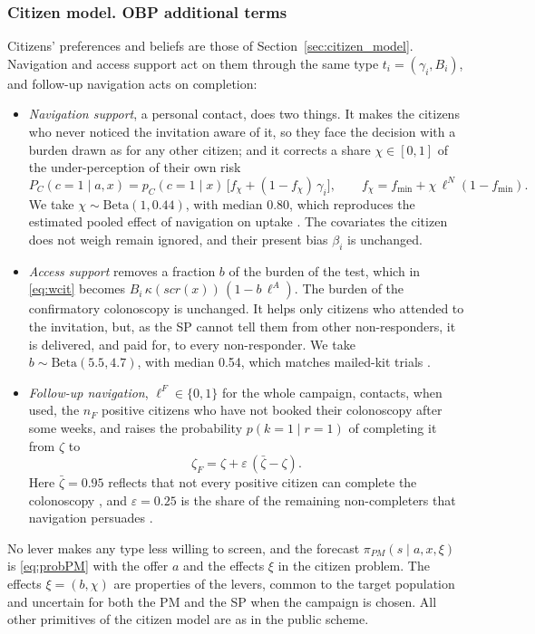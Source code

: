 \documentclass[12pt]{article}
\begin{document}
\subsubsection{Citizen model. OBP additional terms}\label{sec:obp_c}
Citizens' preferences and beliefs are those of Section~\ref{sec:citizen_model}. Navigation and access support act on them through the same type $t_i = (\gamma_i, B_i)$, and follow-up navigation acts on completion:
\begin{itemize}
    \item \emph{Navigation support}, a personal contact, does two things. It makes the citizens who never noticed the invitation aware of it, so they face the decision with a burden drawn as for any other citizen; and it corrects a share $\chi \in [0, 1]$ of the under-perception of their own risk
    \begin{equation*}
        P_C(c=1 \mid a, x) = p_C(c=1 \mid x)\,
        \big[f_{\chi} + (1 - f_{\chi})\, \gamma_i\big], \qquad f_\chi = f_{\min} + \chi\,\ell^N (1 - f_{\min}).
    \end{equation*}
    We take $\chi \sim \mathrm{Beta}(1, 0.44)$, with median 0.80, which reproduces the estimated pooled effect of navigation on uptake \citep{ramai2026}. The covariates the citizen does not weigh remain ignored, and their present bias $\beta_i$ is unchanged.
    \item \emph{Access support} removes a fraction $b$ of the burden of the test, which in \eqref{eq:wcit} becomes $B_i\, \kappa(scr(x))\, (1 - b\, \ell^A)$. The burden of the confirmatory colonoscopy is unchanged. It helps only citizens who attended to the invitation, but, as the SP cannot tell them from other non-responders, it is delivered, and paid for, to every non-responder. We take $b \sim \mathrm{Beta}(5.5, 4.7)$, with median 0.54, which matches mailed-kit trials \citep{piette2017, vanroosbroeck2012}.
    \item \emph{Follow-up navigation}, $\ell^F \in \{0, 1\}$ for the whole campaign, contacts, when used, the $n_F$ positive citizens who have not booked their colonoscopy after some weeks, and raises the probability  $p(k = 1 \mid r = 1)$ of completing it from $\zeta$ to
    \begin{equation*}
        \zeta_F = \zeta + \varepsilon\, (\bar\zeta - \zeta).
    \end{equation*}
    Here $\bar\zeta = 0.95$ reflects that not every positive citizen can complete the colonoscopy \citep{bertels2022}, and $\varepsilon = 0.25$ is the share of the remaining non-completers that navigation persuades \citep{coronado2025, chua2026}.
\end{itemize}
No lever makes any type less willing to screen, and the forecast $\pi_{PM}(s \mid a, x, \xi)$ is \eqref{eq:probPM} with the offer $a$ and the effects $\xi$ in the citizen problem. The effects $\xi = (b, \chi)$ are properties of the levers, common to the target population and uncertain for both the PM and the SP when the campaign is chosen. All other primitives of the citizen model are as in the public scheme.
\end{document}
